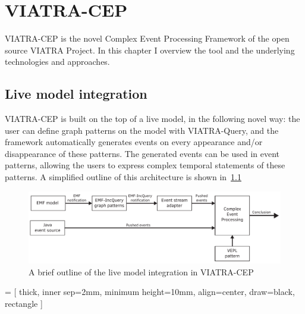 \chapter{VIATRA-CEP}
\label{chap:viatra_cep}
VIATRA-CEP\citep{CEP}\citep{davidi} is the novel Complex Event Processing Framework of the open source VIATRA Project.
In this chapter I overview the tool and the underlying technologies and approaches.

\section{Live model integration}
VIATRA-CEP is built on the top of a live model, in the following novel way:
the user can define graph patterns on the model with VIATRA-Query, and the framework
automatically generates events on every appearance and/or disappearance of these patterns.
The generated events can be used in event patterns, allowing the users to express complex
temporal statements of these patterns. A simplified outline of this architecture is shown in~\cref{fig:viatracep:oldinputs}

\begin{figure}[h]
	\centering
	\includegraphics[width=0.9\linewidth]{figures/chapter_3/oldinput}
	\caption{A brief outline of the live model integration in VIATRA-CEP \redraw}
	\label{fig:viatracep:oldinputs}
\end{figure}

 = [
	thick,
	inner sep=2mm,
	minimum height=10mm,
	align=center,
	draw=black,
	rectangle
]

